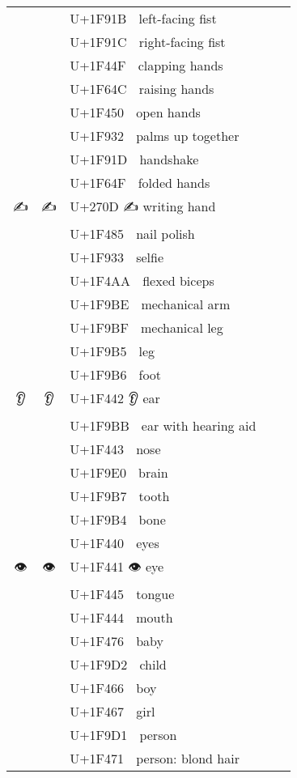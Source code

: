 \documentclass[a4paper,12pt]{article}
\newcommand{\fontA}[1]{{\fontspec[RawFeature={mode=harf,+dist,+ccmp}]{Segoe UI Emoji} #1}}
\newcommand{\fontB}[1]{{\fontspec[RawFeature={mode=harf,+dist,+ccmp}]{Noto Color Emoji} #1}}
\begin{document}
\begin{longtable}[c]{ccp{0.8\linewidth}}
\fontA{🤛}&\fontB{🤛}&U+1F91B 🤛 left-facing fist\\
\fontA{🤜}&\fontB{🤜}&U+1F91C 🤜 right-facing fist\\
\fontA{👏}&\fontB{👏}&U+1F44F 👏 clapping hands\\
\fontA{🙌}&\fontB{🙌}&U+1F64C 🙌 raising hands\\
\fontA{👐}&\fontB{👐}&U+1F450 👐 open hands\\
\fontA{🤲}&\fontB{🤲}&U+1F932 🤲 palms up together\\
\fontA{🤝}&\fontB{🤝}&U+1F91D 🤝 handshake\\
\fontA{🙏}&\fontB{🙏}&U+1F64F 🙏 folded hands\\
\fontA{✍}&\fontB{✍}&U+270D ✍ writing hand\\
\fontA{💅}&\fontB{💅}&U+1F485 💅 nail polish\\
\fontA{🤳}&\fontB{🤳}&U+1F933 🤳 selfie\\
\fontA{💪}&\fontB{💪}&U+1F4AA 💪 flexed biceps\\
\fontA{🦾}&\fontB{🦾}&U+1F9BE 🦾 mechanical arm\\
\fontA{🦿}&\fontB{🦿}&U+1F9BF 🦿 mechanical leg\\
\fontA{🦵}&\fontB{🦵}&U+1F9B5 🦵 leg\\
\fontA{🦶}&\fontB{🦶}&U+1F9B6 🦶 foot\\
\fontA{👂}&\fontB{👂}&U+1F442 👂 ear\\
\fontA{🦻}&\fontB{🦻}&U+1F9BB 🦻 ear with hearing aid\\
\fontA{👃}&\fontB{👃}&U+1F443 👃 nose\\
\fontA{🧠}&\fontB{🧠}&U+1F9E0 🧠 brain\\
\fontA{🦷}&\fontB{🦷}&U+1F9B7 🦷 tooth\\
\fontA{🦴}&\fontB{🦴}&U+1F9B4 🦴 bone\\
\fontA{👀}&\fontB{👀}&U+1F440 👀 eyes\\
\fontA{👁}&\fontB{👁}&U+1F441 👁 eye\\
\fontA{👅}&\fontB{👅}&U+1F445 👅 tongue\\
\fontA{👄}&\fontB{👄}&U+1F444 👄 mouth\\
\fontA{👶}&\fontB{👶}&U+1F476 👶 baby\\
\fontA{🧒}&\fontB{🧒}&U+1F9D2 🧒 child\\
\fontA{👦}&\fontB{👦}&U+1F466 👦 boy\\
\fontA{👧}&\fontB{👧}&U+1F467 👧 girl\\
\fontA{🧑}&\fontB{🧑}&U+1F9D1 🧑 person\\
\fontA{👱}&\fontB{👱}&U+1F471 👱 person: blond hair\\

\end{longtable}
\end{document}

